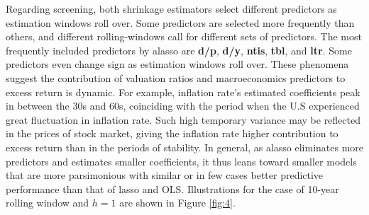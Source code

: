 \documentclass[12pt,a4paper]{article}
\begin{document}
Regarding screening, both shrinkage estimators select different predictors as estimation windows roll over. Some predictors are selected more frequently than others, and different rolling-windows call for different sets of predictors. The most frequently included predictors by alasso are \textbf{d/p}, \textbf{d/y}, \textbf{ntis}, \textbf{tbl}, and \textbf{ltr}. Some predictors even change sign as estimation windows roll over. These phenomena suggest the contribution of valuation ratios and macroeconomics predictors to excess return is dynamic. For example, inflation rate's estimated coefficients peak in between the 30s and 60s, coinciding with the period when the U.S experienced great fluctuation in inflation rate. Such high temporary variance may be reflected in the prices of stock market, giving the inflation rate higher contribution to excess return than in the periods of stability. In general, as alasso eliminates more predictors and estimates smaller coefficients, it thus leans toward smaller models that are more parsimonious \citep{lee2018lasso} with similar or in few cases better predictive performance than that of lasso and OLS. Illustrations for the case of 10-year rolling window and $ h = 1 $ are shown in Figure \ref{fig:4}.
\end{document}

